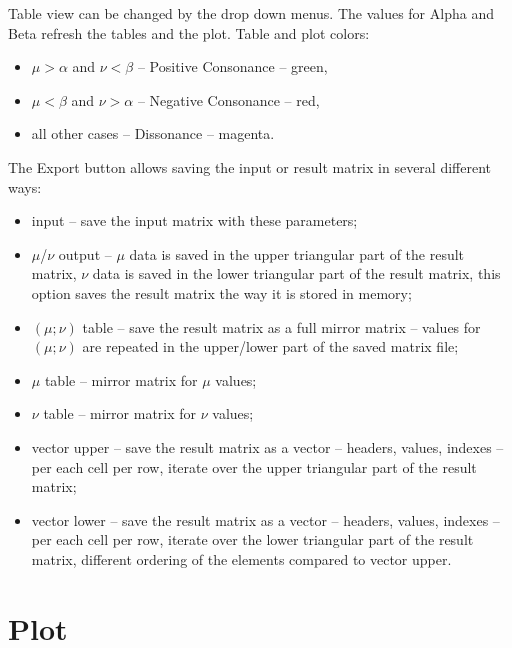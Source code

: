 \documentclass[11pt, a4paper]{article}
\begin{document}
Table view can be changed by the drop down menus.
The values for Alpha and Beta refresh the tables and the plot.
Table and plot colors:
\begin{itemize}
\item $\mu > \alpha$ and $\nu < \beta$ -- Positive Consonance -- green,
\item $\mu < \beta$ and $\nu > \alpha$ -- Negative Consonance -- red,
\item all other cases -- Dissonance -- magenta.
\end{itemize}
The Export button allows saving the input or result matrix in several different ways:
\begin{itemize}
\item input -- save the input matrix with these parameters;
\item $\mu$/$\nu$ output -- $\mu$ data is saved in the upper triangular part of the result matrix,
$\nu$ data is saved in the lower triangular part of the result matrix,
this option saves the result matrix the way it is stored in memory;
\item $(\mu;\nu)$ table -- save the result matrix as a full mirror matrix -- values for $(\mu;\nu)$
are repeated in the upper/lower part of the saved matrix file;
\item $\mu$ table -- mirror matrix for $\mu$ values;
\item $\nu$ table -- mirror matrix for $\nu$ values;
\item vector upper -- save the result matrix as a vector -- headers, values, indexes -- per each cell per row,
iterate over the upper triangular part of the result matrix;
\item vector lower -- save the result matrix as a vector -- headers, values, indexes -- per each cell per row,
iterate over the lower triangular part of the result matrix, different ordering of the elements compared to vector upper.
\end{itemize}


\section{Plot}
\end{document}
